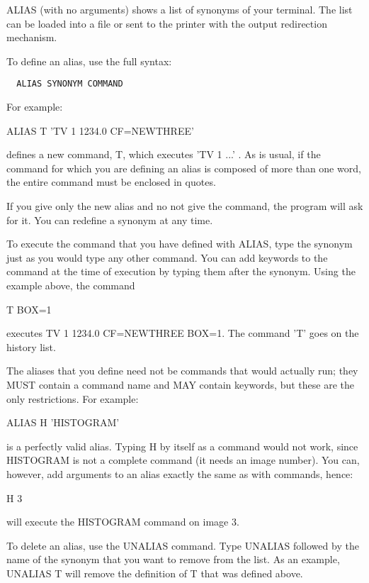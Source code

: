 ALIAS (with no arguments) shows a list of synonyms of your terminal.  The
list can be loaded into a file or sent to the printer with the output
redirection mechanism.

To define an alias, use the full syntax:
\begin{verbatim}
  ALIAS SYNONYM COMMAND
\end{verbatim}
For example:
\begin{hanging}
  \item{ALIAS T 'TV 1 1234.0 CF=NEWTHREE'}
\end{hanging}
defines a new command, T, which executes 'TV 1 ...' . As is usual, if the
command for which you are defining an alias is composed of more than one
word, the entire command must be enclosed in quotes.

If you give only the new alias and no not give the command, the program
will ask for it.  You can redefine a synonym at any time.

To execute the command that you have defined with ALIAS, type the synonym
just as you would type any other command.  You can add keywords to the
command at the time of execution by typing them after the synonym.  Using
the example above, the command
\begin{hanging}
  \item{T BOX=1}
\end{hanging}
executes TV 1 1234.0 CF=NEWTHREE BOX=1.  The command 'T' goes on the
history list. 

The aliases that you define need not be commands that would actually run;
they MUST contain a command name and MAY contain keywords, but these are
the only restrictions.  For example:
\begin{hanging}
  \item{ALIAS H 'HISTOGRAM'}
\end{hanging}
is a perfectly valid alias.  Typing H by itself as a command would not
work, since HISTOGRAM is not a complete command (it needs an image number).
You can, however, add arguments to an alias exactly the same as with
commands, hence:
\begin{hanging}
  \item{H 3\hfill}
\end{hanging}
will execute the HISTOGRAM command on image 3.

To delete an alias, use the UNALIAS command.  Type UNALIAS followed by the
name of the synonym that you want to remove from the list.  As an example,
UNALIAS T will remove the definition of T that was defined above.

